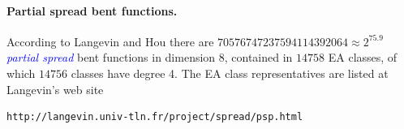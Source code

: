 \documentclass[12pt,a4paper]{article}
\newcommand{\Emph}[1]{\emph{\textcolor{blue}{#1}}}
\begin{document}
\paragraph*{Partial spread bent functions.}

According to Langevin and Hou \cite{LanH11counting}
there are $70576747237594114392064 \approx 2^{75.9}$ \Emph{partial spread} bent functions in
dimension 8,
contained in $14758$ EA classes, of which $14756$ classes have degree 4.
%
%
The EA class representatives are listed at Langevin's web site
%
\begin{verbatim}
http://langevin.univ-tln.fr/project/spread/psp.html
\end{verbatim}

\end{document}
